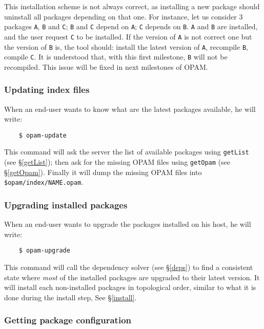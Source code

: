 \documentclass[a4paper,11pt]{article}
\newenvironment{remark}[1][Remark]{\begin{trivlist}
\item[\hskip \labelsep {\bfseries #1}]}{\end{trivlist}}
\begin{document}
\begin{remark}
This installation scheme is not always correct, as installing a new
package should uninstall all packages depending on that one. For
instance, let us consider 3 packages {\tt A}, {\tt B} and {\tt C};
{\tt B} and {\tt C} depend on {\tt A}; {\tt C} depends on {\tt B}.
{\tt A} and {\tt B} are installed, and the user request {\tt C} to be
installed. If the version of {\tt A} is not correct one but the
version of {\tt B} is, the tool should: install the latest version of
{\tt A}, recompile {\tt B}, compile {\tt C}. It is understood that,
with this first milestone, {\tt B} will not be recompiled. This issue
will be fixed in next milestones of OPAM.
\end{remark}

\subsubsection{Updating index files}

When an end-user wants to know what are the latest packages available,
he will write:

\begin{verbatim}
    $ opam-update
\end{verbatim}

This command will ask the server the list of available packages using
{\tt getList} (see \S\ref{getList}); then ask for the missing OPAM
files using {\tt getOpam} (see \S\ref{getOpam}). Finally it will dump
the missing OPAM files into {\tt \$opam/index/NAME.opam}.

\subsubsection{Upgrading installed packages}

When an end-user wants to upgrade the packages installed on his host,
he will write:

\begin{verbatim}
    $ opam-upgrade
\end{verbatim}

This command will call the dependency solver (see \S\ref{deps}) to
find a consistent state where {\em most} of the installed packages are
upgraded to their latest version. It will install each non-installed
packages in topological order, similar to what it is done during the
install step, See \S\ref{install}.

\subsubsection{Getting package configuration}
\end{document}
